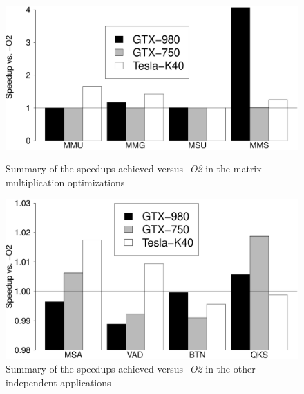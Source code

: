 \begin{figure}[htpb]
    \centering
    \begin{minipage}{.48\textwidth}
        \centering
        \includegraphics[scale=.15]{./images/MatrixSummary.eps}
        \caption{Summary of the speedups achieved versus \emph{-O2} in the matrix multiplication optimizations}
        \label{fig:matrixsummary}
    \end{minipage}%
    \hfill
    \begin{minipage}{.48\textwidth}
        \centering
        \includegraphics[scale=.15]{./images/Summary.eps}
        \caption{Summary of the speedups achieved versus \emph{-O2} in the other independent applications}
        \label{fig:summary}
    \end{minipage}%


\end{figure}
